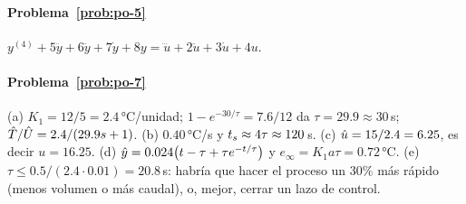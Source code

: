 \paragraph{Problema~\ref{prob:po-5}}
$y^{(4)}+5\dddot y+6\ddot y+7\dot y+8y=\dddot u+2\ddot u+3\dot u+4u$.

\paragraph{Problema~\ref{prob:po-7}}
(a) $K_1=12/5=2.4$\,°C/unidad; $1-e^{-30/\tau}=7.6/12$ da $\tau=29.9\approx30$\,s; $\hat{T}/\hat{U}=2.4/(29.9s+1)$. (b) $0.40$\,°C/s y $t_s\approx4\tau\approx120$\,s. (c) $\hat{u}=15/2.4=6.25$, es decir $u=16.25$. (d) $\hat{y}=0.024\bigl(t-\tau+\tau e^{-t/\tau}\bigr)$ y $e_\infty=K_1a\tau=0.72$\,°C. (e) $\tau\leq0.5/(2.4\cdot0.01)=20.8$\,s: habría que hacer el proceso un $30\%$ más rápido (menos volumen o más caudal), o, mejor, cerrar un lazo de control.


\respuestaspausas
